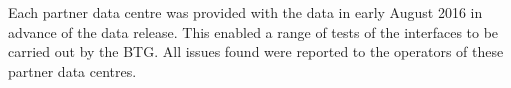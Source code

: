 Each partner data centre was provided with the {}  data in early August 2016 in advance of the {}  data release. This enabled a range of tests of the interfaces to be carried out by the BTG. All issues found were reported to the operators of these partner data centres. 

%
